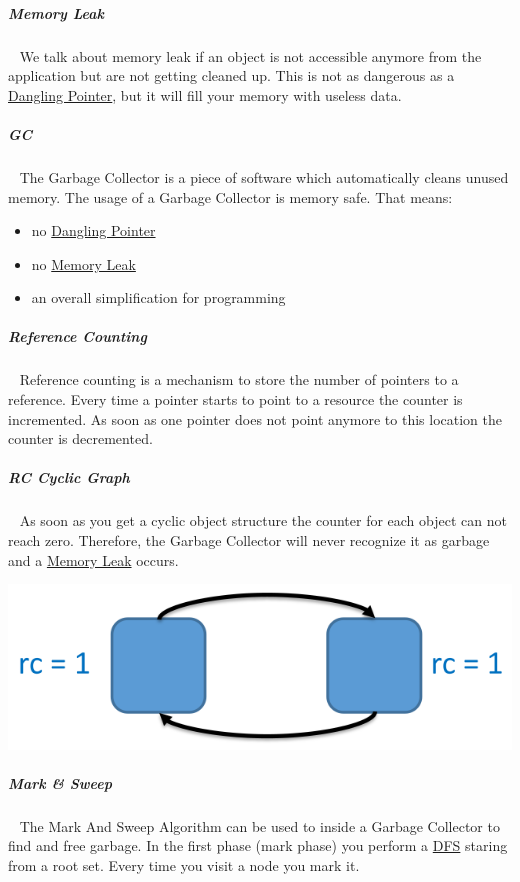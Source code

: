 \documentclass[11pt,twoside,landscape]{article}
\begin{document}
\begin{multicols}{3}
\subparagraph{Memory Leak} \
\label{sec:org539e8fc}
We talk about memory leak if an object is not accessible anymore from the application but are not getting cleaned up.
This is not as dangerous as a \href{../../../roam/20221230183145-what_is_a_dangling_pointer.org}{Dangling Pointer}, but it will fill your memory with useless data.

\subparagraph{GC} \
\label{sec:org60fa478}
The Garbage Collector is a piece of software which automatically cleans unused memory.
The usage of a Garbage Collector is memory safe.
That means:
\begin{itemize}
\item no \href{../../../roam/20221230183145-what_is_a_dangling_pointer.org}{Dangling Pointer}
\item no \href{../../../roam/20221230183215-what_is_a_memory_leak.org}{Memory Leak}
\item an overall simplification for programming
\end{itemize}

\subparagraph{Reference Counting} \
\label{sec:org82bb2f2}
Reference counting is a mechanism to store the number of pointers to a reference.
Every time a pointer starts to point to a resource the counter is incremented.
As soon as one pointer does not point anymore to this location the counter is decremented.

\subparagraph{RC Cyclic Graph} \
\label{sec:org85cb02a}
As soon as you get a cyclic object structure the counter for each object can not reach zero.
Therefore, the Garbage Collector will never recognize it as garbage and a \href{../../../roam/20221230183215-what_is_a_memory_leak.org}{Memory Leak} occurs.


{
\begin{center}
\includegraphics[width=.9\linewidth]{img/cyclic_object_structure.png}
\end{center}
\label{fig:cyclic-object-structure}
}

\subparagraph{Mark \& Sweep} \
\label{sec:org0f0915b}
The Mark And Sweep Algorithm can be used to inside a Garbage Collector to find and free garbage.
In the first phase (mark phase) you perform a \href{../../../roam/20220202095038-dfs.org}{DFS} staring from a root set.
Every time you visit a node you mark it.


\end{multicols}
\end{document}

